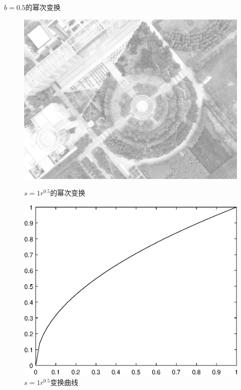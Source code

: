 $b=0.5$的幂次变换
\begin{figure}[H]
	\centering
	\begin{minipage}{0.45\linewidth}
		\includegraphics[width=\linewidth]{figure/DJI_0027_Gamma_50.png}
		\caption{$s=1r^0.5$的幂次变换}
	\end{minipage}
	\begin{minipage}{0.45\linewidth}
		\includegraphics[width=\linewidth]{figure/DJI_0027_Gamma_50_Graph.eps}
		\caption{$s=1r^{0.5}$变换曲线}
	\end{minipage}
\end{figure}

